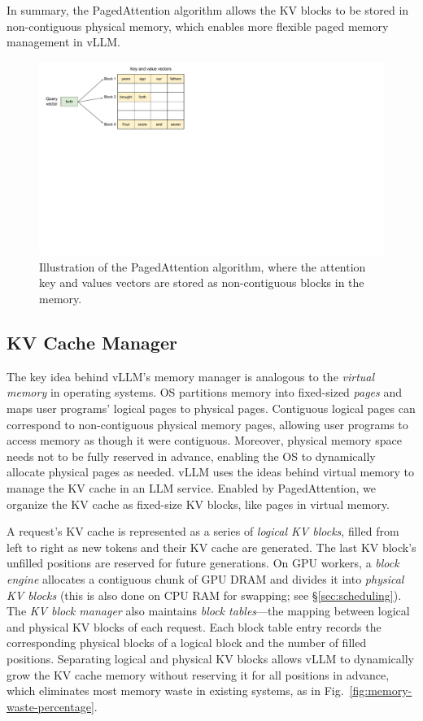 \documentclass[sigplan,10pt]{acmart}
\newcommand{\tech}[0]{PagedAttention\xspace}
\newcommand{\sys}[0]{vLLM\xspace}
\begin{document}
In summary, the \tech algorithm allows the KV blocks to be stored in non-contiguous physical memory, which enables more flexible paged memory management in \sys.

\begin{figure}
    \centering
    \includegraphics[width=.8\columnwidth]{figures/pagedattention.pdf}
    \vspace{-5pt}
    \caption{Illustration of the \tech algorithm, where the attention key and values vectors are stored as non-contiguous blocks in the memory. }
    \label{fig:pagedattention}
    \vspace{-10pt}
\end{figure}


\subsection{KV Cache Manager}
\label{sec:block-space-manager}

The key idea behind \sys's memory manager is analogous to the \emph{virtual memory} \cite{kilburn1962one} in operating systems. OS partitions memory into fixed-sized \emph{pages} and maps user programs' logical pages to physical pages. Contiguous logical pages can correspond to non-contiguous physical memory pages, allowing user programs to access memory as though it were contiguous. Moreover, physical memory space needs not to be fully reserved in advance, enabling the OS to dynamically allocate physical pages as needed. \sys uses the ideas behind virtual memory to manage the KV cache in an LLM service. Enabled by \tech, we organize the KV cache as fixed-size KV blocks, like pages in virtual memory. 

A request's KV cache is represented as a series of \emph{logical KV blocks}, filled from left to right as new tokens and their KV cache are generated. 
The last KV block's unfilled positions are reserved for future generations.
On GPU workers, a \emph{block engine} allocates a contiguous chunk of GPU DRAM and divides it into \emph{physical KV blocks} (this is also done on CPU RAM for swapping; see \S\ref{sec:scheduling}). The \emph{KV block manager} also maintains \emph{block tables}---the mapping between logical and physical KV blocks of each request. Each block table entry records the corresponding physical blocks of a logical block and the number of filled positions. Separating logical and physical KV blocks allows \sys to dynamically grow the KV cache memory without reserving it for all positions in advance, which eliminates most memory waste in existing systems, as in Fig.~\ref{fig:memory-waste-percentage}. 
\end{document}
